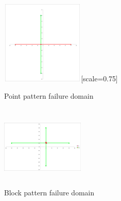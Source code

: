 \documentclass{acm_proc_article-sp}
\begin{document}


\begin{figure}[htp]
\centering
\includegraphics[width=4cm,height=4cm]{point_pattern.png}[scale=0.75]
\caption{Point pattern failure domain}
\label{fig:patterns}
\end{figure}




\begin{figure}[htp]
\centering
\includegraphics[width=4cm,height=4cm]{block_pattern.png}
\caption{Block pattern failure domain}
\label{fig:patterns}
\end{figure}



\end{document}
